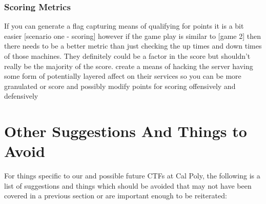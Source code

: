\documentclass[10pt]{article}
\begin{document}
\subsubsection{Scoring Metrics}
If you can generate a flag capturing means of qualifying for points it is a bit easier
[scenario one - scoring] however if the game play is similar to [game 2] then there
needs to be a better metric than just checking the up times and down times of those machines.
They definitely could be a factor in the score but shouldn't really be the majority of the score.
create a means of hacking the server having some form of potentially layered affect on their
services so you can be more granulated or score and possibly modify points for scoring
offensively and defensively

\section{Other Suggestions And Things to Avoid}
For things specific to our and possible future CTFs at Cal Poly, the following
is a list of suggestions and things which should be avoided that may not have
been covered in a previous section or are important enough to be reiterated:
\end{document}
